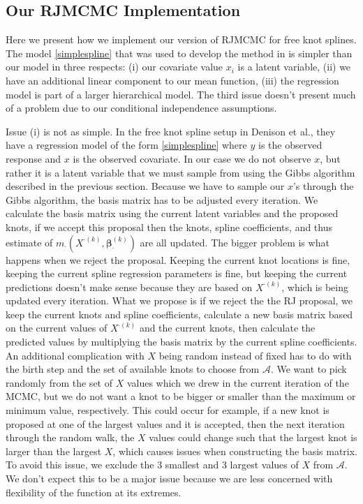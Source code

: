 \documentclass[11pt]{article}\usepackage[]{graphicx}\usepackage[]{color}
\begin{document}
\subsection{Our RJMCMC Implementation}

Here we present how we implement our version of RJMCMC for free knot splines. The model \eqref{simplespline} that was used to develop the method in \cite{denison} is simpler than our model in three respects: (i) our covariate value $x_i$ is a latent variable, (ii) we have an additional linear component to our mean function, (iii) the regression model is part of a larger hierarchical model. The third issue doesn't present much of a problem due to our conditional independence assumptions. 

Issue (i) is not as simple. In the free knot spline setup in Denison et al., they have a regression model of the form \eqref{simplespline} where $y$ is the observed response and $x$ is the observed covariate. In our case we do not observe $x$, but rather it is a latent variable that we must sample from using the Gibbs algorithm described in the previous section. Because we have to sample our $x$'s through the Gibbs algorithm, the basis matrix has to be adjusted every iteration. We calculate the basis matrix using the current latent variables and  the proposed knots, if we accept this proposal then the knots, spline coefficients, and thus estimate of $m_{\cdot}(X^{\cdot (k)},\boldsymbol{\beta}_{\cdot}^{(k)})$ are all updated. The bigger problem is what happens when we reject the proposal. Keeping the current knot locations is fine, keeping the current spline regression parameters is fine, but keeping the current predictions doesn't make sense because they are based on $X^{\cdot (k)}$, which is being updated every iteration. What we propose is if we reject the the RJ proposal, we keep the current knots and spline coefficients, calculate a new basis matrix based on the current values of $X^{\cdot (k)}$ and the current knots, then calculate the predicted values by multiplying the basis matrix by the current spline coefficients. An additional complication with $X$ being random instead of fixed has to do with the birth step and the set of available knots to choose from $\mathcal{A}$. We want to pick randomly from the set of $X$ values which we drew in the current iteration of the MCMC, but we do not want a knot to be bigger or smaller than the maximum or minimum value, respectively. This could occur for example, if a new knot is proposed at one of the largest values and it is accepted, then the next iteration through the random walk, the $X$ values could change such that the largest knot is larger than the largest $X$, which causes issues when constructing the basis matrix. To avoid this issue, we exclude the 3 smallest and 3 largest values of $X$ from $\mathcal{A}$. We don't expect this to be a major issue because we are less concerned with flexibility of the function at its extremes.
\end{document}
